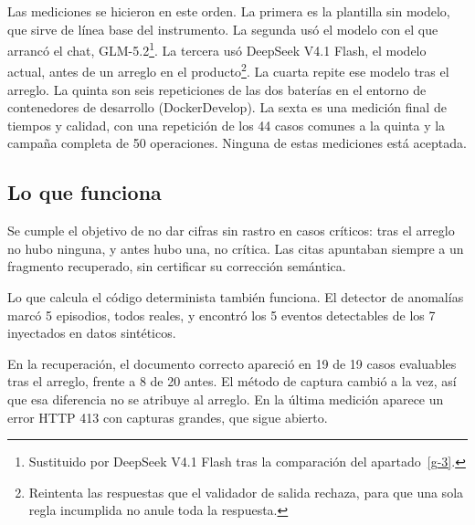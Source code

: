 Las mediciones se hicieron en este orden. La primera es la plantilla sin modelo, que sirve de línea base del instrumento. La segunda usó el modelo con el que arrancó el chat, GLM-5.2\footnote{Sustituido por DeepSeek V4.1 Flash tras la comparación del apartado~\ref{g-3}.}. La tercera usó DeepSeek V4.1 Flash, el modelo actual, antes de un arreglo en el producto\footnote{Reintenta las respuestas que el validador de salida rechaza, para que una sola regla incumplida no anule toda la respuesta.}. La cuarta repite ese modelo tras el arreglo. La quinta son seis repeticiones de las dos baterías en el entorno de contenedores de desarrollo (DockerDevelop). La sexta es una medición final de tiempos y calidad, con una repetición de los 44 casos comunes a la quinta y la campaña completa de 50 operaciones. Ninguna de estas mediciones está aceptada.

\subsection{Lo que funciona}\label{h-2}

Se cumple el objetivo de no dar cifras sin rastro en casos críticos: tras el arreglo no hubo ninguna, y antes hubo una, no crítica. Las citas apuntaban siempre a un fragmento recuperado, sin certificar su corrección semántica.

Lo que calcula el código determinista también funciona. El detector de anomalías marcó 5 episodios, todos reales, y encontró los 5 eventos detectables de los 7 inyectados en datos sintéticos. \cite{evaluacion}

En la recuperación, el documento correcto apareció en 19 de 19 casos evaluables tras el arreglo, frente a 8 de 20 antes. El método de captura cambió a la vez, así que esa diferencia no se atribuye al arreglo. En la última medición aparece un error HTTP 413 con capturas grandes, que sigue abierto.

